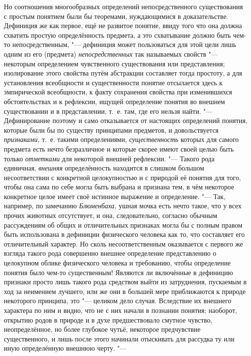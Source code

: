 Но соотношения многообразных определений непосредственного
существования с простым понятием были бы теоремами, нуждающимися в
доказательстве. Дефиниция же как первое, ещё не развитое понятие, ввиду
того что она должна схватить простую определённость предмета, а это
схватывание должно быть чем-то непосредственным, "--- дефиниция
может пользоваться для этой цели лишь одним из его (предмета)
{\em непосредственных}
так называемых свойств "--- некоторым
определением чувственного существования или представления; изолирование
этого свойства путём абстракции составляет тогда простоту, а для
установления всеобщности и существенности понятие отсылается здесь к
эмпирической всеобщности, к факту сохранения свойства при изменившихся
обстоятельствах и к рефлексии, ищущей определение понятия во внешнем
существовании и в представлении, т.~е. там, где его нельзя найти. "---
Дефинирование поэтому и само отказывается от настоящих
определений понятия, которые были бы по существу принципами предметов, и
довольствуется {\em признаками,}
т.~е. такими определениями,
{\em существенность}
которых для самого предмета есть нечто безразличное и которые
скорее имеют своей целью быть только
{\em отметками} для
некоторой внешней рефлексии. "--- Такого рода единичная,
{\em внешняя}
определённость находится в слишком большом несоответствии с
конкретной целокупностью и с природой её понятия для того, чтобы она сама
по себе могла быть выбрана и признана тем, в чём некоторое конкретное целое
имеет своё истинное выражение и определение. "--- Так,
например, по замечанию
{\em Блюменбаха,} ушная
мочка есть нечто такое, что у всех прочих животных отсутствует, и она,
следовательно, согласно обычным рассуждениям об общих и
отличительных признаках могла бы с полным правом быть
использована в дефиниции физического человека как то, что составляет его
отличительный характер. Но сколь несоответственным оказывается с первого же
взгляда такого рода совершенно внешнее определение представлению о
целокупном облике физического человека и требованию, чтобы определение
понятия было чем-то существенным! Являются ли включённые в дефиницию
признаки просто лишь такого рода средством выйти из затруднения, пускаемым
в ход за неимением лучшего, или же они в большей мере приближаются к
природе некоторого принципа, это "--- целиком дело случая.
Вследствие их внешнего характера по ним и видно, что не с них начали в
познании понятия; наоборот, открытию родов в природе и в духе
предшествовало смутное чувство, неопределённое, но более глубокое чутьё,
некоторое предчувствие существенного, и лишь после этого начинали
отыскивать для рассудка ту или иную определённую внешнюю черту. "---
